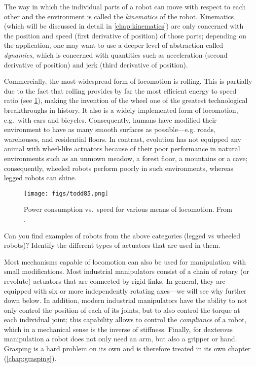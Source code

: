 The way in which the individual parts of a robot can move with respect to each other and the environment is called the \textsl{kinematics} of the robot. Kinematics (which will be discussed in detail in \cref{chap:kinematics}) are only concerned with the position and speed (first derivative of position) of those parts; depending on the application, one may want to use a deeper level of abstraction called \textsl{dynamics}, which is concerned with quantities such as acceleration (second derivative of position) and jerk (third derivative of position).

Commercially, the most widespread form of locomotion is rolling. This is partially due to the fact that rolling provides by far the most efficient energy to speed ratio (see \cref{fig:todd}), making the invention of the wheel one of the greatest technological breakthroughs in history. It also is a widely implemented form of locomotion, e.g.\ with cars and bicycles. Consequently, humans have modified their environment to have as many smooth surfaces as possible---e.g. roads, warehouses, and residential floors.
%
In contrast, evolution has not equipped any animal with wheel-like actuators because of their poor performance in natural environments such as an unmown meadow, a forest floor, a mountains or a cave; consequently, wheeled robots perform poorly in such environments, whereas legged robots can shine.

\begin{figure}
    \centering
    \texttt{[image: figs/todd85.png]}
    \caption{Power consumption vs.\ speed for various means of locomotion. From \protect{}.}
    \label{fig:todd}
\end{figure}


\begin{mdframed}Can you find examples of robots from the above categories (legged vs wheeled robots)? Identify the different types of actuators that are used in them.
\end{mdframed}

Most mechanisms capable of locomotion can also be used for manipulation with small modifications. Most industrial manipulators consist of a chain of rotary (or revolute) actuators that are connected by rigid links. In general, they are equipped with six or more independently rotating axes---we will see why further down below. In addition, modern industrial manipulators have the ability to not only control the position of each of its joints, but to also control the torque at each individual joint; this capability allows to control the \textsl{compliance} of a robot, which in a mechanical sense is the inverse of stiffness. Finally, for dexterous manipulation a robot does not only need an arm, but also a gripper or hand. Grasping is a hard problem on its own and is therefore treated in its own chapter (\cref{chap:grasping}).

